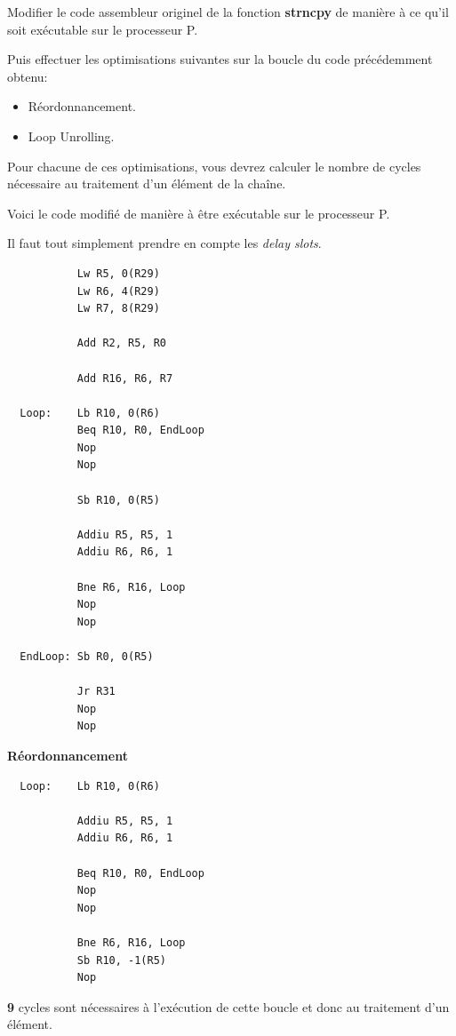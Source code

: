 Modifier le code assembleur originel de la fonction \textbf{strncpy} de
mani\`ere \`a ce qu'il soit ex\'ecutable sur le processeur P.

Puis effectuer les optimisations suivantes sur la boucle du code
pr\'ec\'edemment obtenu:

\begin{itemize}
  \item
    R\'eordonnancement.
  \item
    Loop Unrolling.
\end{itemize}

Pour chacune de ces optimisations, vous devrez calculer le nombre de cycles
n\'ecessaire au traitement d'un \'el\'ement de la cha\^ine.

\begin{correction}

  Voici le code modifi\'e de mani\`ere \`a \^etre ex\'ecutable sur le processeur
  P.

  Il faut tout simplement prendre en compte les \textit{delay slots}.

  \begin{verbatim}
           Lw R5, 0(R29)
           Lw R6, 4(R29)
           Lw R7, 8(R29)

           Add R2, R5, R0

           Add R16, R6, R7

  Loop:    Lb R10, 0(R6)
           Beq R10, R0, EndLoop
           Nop
           Nop

           Sb R10, 0(R5)

           Addiu R5, R5, 1
           Addiu R6, R6, 1

           Bne R6, R16, Loop
           Nop
           Nop

  EndLoop: Sb R0, 0(R5)

           Jr R31
           Nop
           Nop
  \end{verbatim}

  \textbf{R\'eordonnancement}

  \begin{verbatim}
  Loop:    Lb R10, 0(R6)

           Addiu R5, R5, 1
           Addiu R6, R6, 1

           Beq R10, R0, EndLoop
           Nop
           Nop

           Bne R6, R16, Loop
           Sb R10, -1(R5)
           Nop
  \end{verbatim}

  \textbf{9} cycles sont n\'ecessaires \`a l'ex\'ecution de cette boucle et
  donc au traitement d'un \'el\'ement.


\end{correction}
